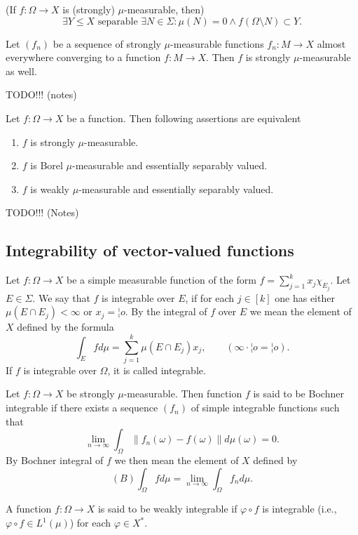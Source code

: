 \documentclass[12pt]{article}					%
\begin{document}

\begin{definice}
	(If $f: Ω \rightarrow X$ is (strongly) $μ$-measurable, then)
	$$ \exists Y ≤ X \text{ separable } \exists N \in Σ: μ(N) = 0 \land f(Ω \setminus N) \subset Y. $$
\end{definice}

\begin{lemma}
	Let $(f_n)$ be a sequence of strongly $μ$-measurable functions $f_n: M \rightarrow X$ almost everywhere converging to a function $f: M \rightarrow X$. Then $f$ is strongly $μ$-measurable as well.

	\begin{dukazin}
		TODO!!! (notes)
	\end{dukazin}
\end{lemma}

\begin{veta}[Pettis]
	Let $f: Ω \rightarrow X$ be a function. Then following assertions are equivalent
	\begin{enumerate}
		\item $f$ is strongly $μ$-measurable.
		\item $f$ is Borel $μ$-measurable and essentially separably valued.
		\item $f$ is weakly $μ$-measurable and essentially separably valued.
	\end{enumerate}

	\begin{dukazin}
		TODO!!! (Notes)
	\end{dukazin}
\end{veta}

\subsection{Integrability of vector-valued functions}
\begin{definice}
	Let $f: Ω \rightarrow X$ be a simple measurable function of the form $f = \sum_{j=1}^k x_j χ_{E_j}$. Let $E \in Σ$. We say that $f$ is integrable over $E$, if for each $j \in [k]$ one has either $μ(E \cap E_j) < ∞$ or $x_j = ¦o$. By the integral of $f$ over $E$ we mean the element of $X$ defined by the formula
	$$ \int_E f dμ = \sum_{j=1}^k μ(E \cap E_j) x_j, \qquad (∞·¦o = ¦o). $$
	If $f$ is integrable over $Ω$, it is called integrable.

	Let $f: Ω \rightarrow X$ be strongly $μ$-measurable. Then function $f$ is said to be Bochner integrable if there exists a sequence $(f_n)$ of simple integrable functions such that
	$$ \lim_{n \rightarrow ∞} \int_Ω \|f_n(ω) - f(ω)\| dμ(ω) = 0. $$
	By Bochner integral of $f$ we then mean the element of $X$ defined by
	$$ (B) \int_Ω f dμ = \lim_{n \rightarrow ∞} \int_Ω f_n dμ. $$

	A function $f: Ω \rightarrow X$ is said to be weakly integrable if $φ ∘ f$ is integrable (i.e., $φ ∘ f \in L^1(μ)$) for each $φ \in X^*$.
\end{definice}
\end{document}
